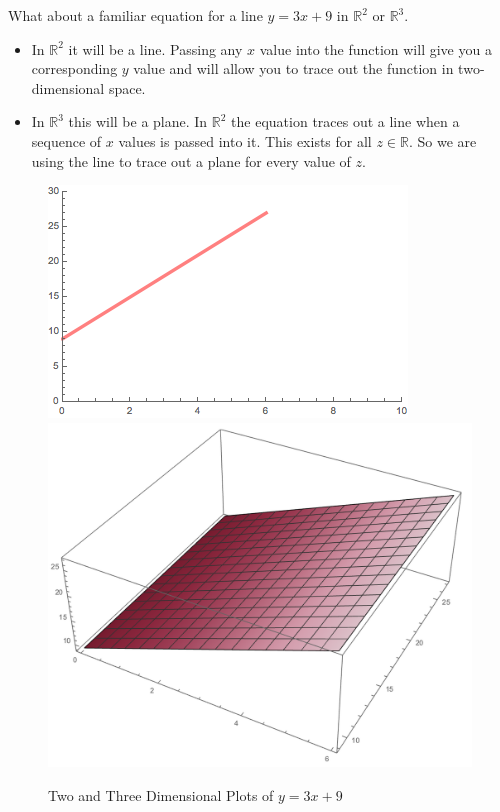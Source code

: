 \documentclass[12pt]{article}
\begin{document}
 What about a familiar equation for a line $y=3x+9$ in $\mathbb{R}^2$ or $\mathbb{R}^3$.
\begin{itemize}
\item In $\mathbb{R}^2$ it will be a line. Passing any $x$ value into the function will give you a corresponding $y$ value and will allow you to trace out the function in two-dimensional space.
\item In $\mathbb{R}^3$ this will be a plane. In $\mathbb{R}^2$ the equation traces out a line when a sequence of $x$ values is passed into it. This exists for all $z\in\mathbb{R}$. So we are using the line to trace out a plane for every value of $z$. 
\end{itemize}

\begin{figure}[H]
\centering
\caption{Two and Three Dimensional Plots of $y=3x+9$}
\label{fig:eq_line}
\indent\includegraphics[scale=0.6]{eq_line.png}
\indent\includegraphics[scale=0.4]{eq_plane.png}
\end{figure}
\end{document}
